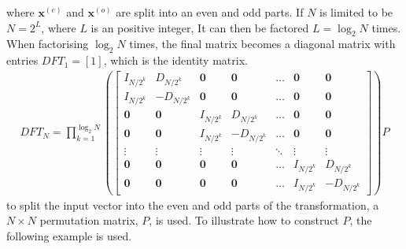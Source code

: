where $\mathbf{x}^{(e)}$ and $\mathbf{x}^{(o)}$ are split into an even and odd parts.  
If $N$ is limited to be $N=2^L$, where $L$ is an positive integer, It can then be factored $L=\log_2 N$ times. When factorising $\log_2 N$ times, the final matrix becomes a diagonal matrix with entries $DFT_1=[1]$, which is the identity matrix. \cite[68-69]{ryan2019linear}
\begin{align*}
    DFT_N=\prod_{k=1}^{\log_2 N}\left(
    \begin{bmatrix}
    I_{N/2^k}  & D_{N/2^k}  & \mathbf{0} & \mathbf{0} & \hdots & \mathbf{0} & \mathbf{0}\\
    I_{N/2^k}  & -D_{N/2^k} & \mathbf{0} & \mathbf{0} & \hdots & \mathbf{0} & \mathbf{0}\\
    \mathbf{0} & \mathbf{0} & I_{N/2^k}  & D_{N/2^k}  & \hdots & \mathbf{0} & \mathbf{0}\\
    \mathbf{0} & \mathbf{0} & I_{N/2^k}  & -D_{N/2^k} & \hdots & \mathbf{0} & \mathbf{0}\\
    \vdots     & \vdots     & \vdots     & \vdots     & \ddots & \vdots     & \vdots    \\
    \mathbf{0} & \mathbf{0} & \mathbf{0} & \mathbf{0} & \hdots & I_{N/2^k}  & D_{N/2^k} \\
    \mathbf{0} & \mathbf{0} & \mathbf{0} & \mathbf{0} & \hdots & I_{N/2^k}  & -D_{N/2^k}
    \end{bmatrix}
    \right)P
\end{align*}
to split the input vector into the even and odd parts of the transformation, a $N\times N$ permutation matrix, $P$, is used. To illustrate how to construct $P$, the following example is used. 
